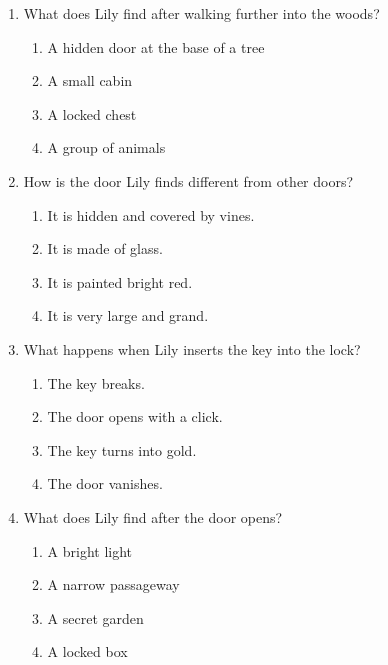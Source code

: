 \documentclass[12pt]{article}
\begin{document}
\begin{enumerate}
    \vspace{0.5cm}

    \item What does Lily find after walking further into the woods?
    \begin{enumerate}[label=\Alph*.]
        \item A hidden door at the base of a tree
        \item A small cabin
        \item A locked chest
        \item A group of animals
    \end{enumerate}

    \vspace{0.5cm}

    \item How is the door Lily finds different from other doors?
    \begin{enumerate}[label=\Alph*.]
        \item It is hidden and covered by vines.
        \item It is made of glass.
        \item It is painted bright red.
        \item It is very large and grand.
    \end{enumerate}

    \vspace{0.5cm}

    \item What happens when Lily inserts the key into the lock?
    \begin{enumerate}[label=\Alph*.]
        \item The key breaks.
        \item The door opens with a click.
        \item The key turns into gold.
        \item The door vanishes.
    \end{enumerate}

    \vspace{0.5cm}

    \item What does Lily find after the door opens?
    \begin{enumerate}[label=\Alph*.]
        \item A bright light
        \item A narrow passageway
        \item A secret garden
        \item A locked box
    \end{enumerate}


\end{enumerate}
\end{document}
